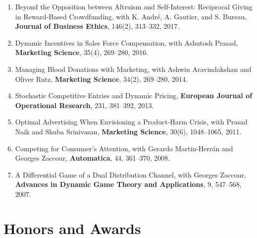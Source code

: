 \documentclass[10pt]{article}
\newcommand{\paper}[1]{\item #1}
\begin{document}
\begin{enumerate}
\paper{Beyond the Opposition between Altruism and Self-Interest: Reciprocal Giving in Reward-Based Crowdfunding, with K. Andr\'{e}, A. Gautier, and S. Bureau, \textbf{Journal of Business Ethics}, 146(2), 313--332, 2017.}

\paper{Dynamic Incentives in Sales Force Compensation, with Ashutosh Prasad, \textbf{Marketing Science}, 35(4), 269--280, 2016.}

\paper{Managing Blood Donations with Marketing, with Ashwin Aravindakshan and Oliver Rutz, \textbf{Marketing Science}, 34(2), 269--280, 2014.}

\paper{Stochastic Competitive Entries and Dynamic Pricing, \textbf{European Journal of Operational Research}, 231, 381--392, 2013.}

\paper{Optimal Advertising When Envisioning a Product-Harm Crisis, with Prasad Naik and Shuba Srinivasan, \textbf{Marketing Science}, 30(6), 1048--1065, 2011.}

\paper{Competing for Consumer's Attention, with Gerardo Martin-Herr\'{a}n and Georges Zaccour, \textbf{Automatica}, 44, 361--370, 2008.}

\paper{A Differential Game of a Dual Distribution Channel, with Georges Zaccour, \textbf{Advances in Dynamic Game Theory and Applications}, 9, 547--568, 2007.}
\end{enumerate}



\section{Honors and Awards}
\end{document}
